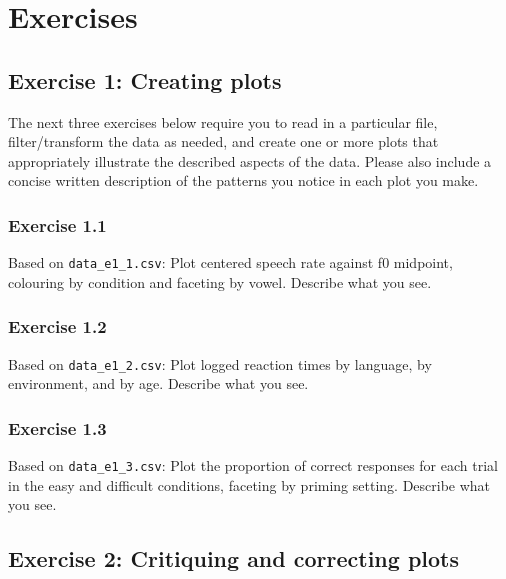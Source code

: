 \documentclass[
]{article}
\begin{document}
\newpage

\hypertarget{exercises}{%
\section{Exercises}\label{exercises}}

\hypertarget{exercise-1-creating-plots}{%
\subsection{Exercise 1: Creating
plots}\label{exercise-1-creating-plots}}

The next three exercises below require you to read in a particular file,
filter/transform the data as needed, and create one or more plots that
appropriately illustrate the described aspects of the data. Please also
include a concise written description of the patterns you notice in each
plot you make.

\hypertarget{exercise-1.1}{%
\subsubsection{Exercise 1.1}\label{exercise-1.1}}

Based on \texttt{data\_e1\_1.csv}: Plot centered speech rate against f0
midpoint, colouring by condition and faceting by vowel. Describe what
you see.

\hypertarget{exercise-1.2}{%
\subsubsection{Exercise 1.2}\label{exercise-1.2}}

Based on \texttt{data\_e1\_2.csv}: Plot logged reaction times by
language, by environment, and by age. Describe what you see.

\hypertarget{exercise-1.3}{%
\subsubsection{Exercise 1.3}\label{exercise-1.3}}

Based on \texttt{data\_e1\_3.csv}: Plot the proportion of correct
responses for each trial in the easy and difficult conditions, faceting
by priming setting. Describe what you see.

\newpage

\hypertarget{exercise-2-critiquing-and-correcting-plots}{%
\subsection{Exercise 2: Critiquing and correcting
plots}\label{exercise-2-critiquing-and-correcting-plots}}
\end{document}
